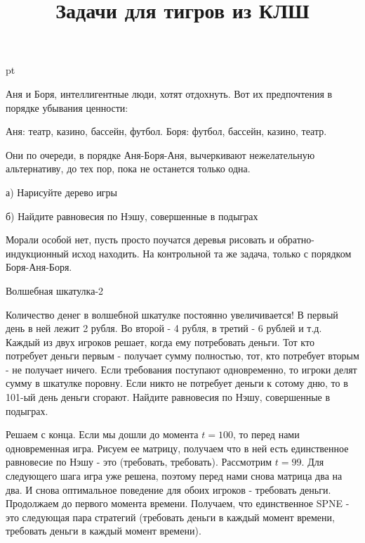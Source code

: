 \documentclass[pdftex,12pt,a4paper]{article}
\title{Задачи для тигров из КЛШ}
\begin{document}
\maketitle

 pt %



Аня и Боря, интеллигентные люди, хотят отдохнуть.
Вот их предпочтения в порядке убывания ценности:\par
Аня: театр, казино, бассейн, футбол. Боря: футбол, бассейн, казино, театр.

Они по очереди, в порядке Аня-Боря-Аня, вычеркивают нежелательную альтернативу, до тех пор, пока не останется только одна. 

а) Нарисуйте дерево игры

б) Найдите равновесия по Нэшу, совершенные в подыграх\par

\vspace{10pt}
Морали особой нет, пусть просто поучатся деревья рисовать и обратно-индукционный исход находить. На контрольной та же задача, только с порядком Боря-Аня-Боря.


\vspace{10pt}
Волшебная шкатулка-2 \par 
Количество денег в волшебной шкатулке постоянно увеличивается! В первый день в ней лежит 2 рубля. Во второй - 4 рубля, в третий - 6 рублей и т.д. Каждый из двух игроков решает, когда ему потребовать деньги. Тот кто потребует деньги первым - получает сумму полностью, тот, кто потребует вторым - не получает ничего. Если требования поступают одновременно, то игроки делят сумму в шкатулке поровну. Если никто не потребует деньги к сотому дню, то в 101-ый день деньги сгорают. Найдите равновесия по Нэшу, совершенные в подыграх.\par

\vspace{10pt}
Решаем с конца. Если мы дошли до момента $t=100$, то перед нами одновременная игра. Рисуем ее матрицу, получаем что в ней есть единственное равновесие по Нэшу - это (требовать, требовать). Рассмотрим $t=99$. Для следующего шага игра уже решена, поэтому перед нами снова матрица два на два. И снова оптимальное поведение для обоих игроков - требовать деньги. Продолжаем до первого момента времени. Получаем, что единственное SPNE - это следующая пара стратегий (требовать деньги в каждый момент времени, требовать деньги в каждый момент времени).
\end{document}
